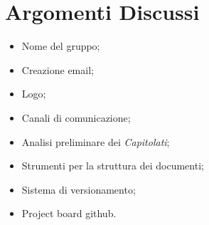 \section{Argomenti Discussi}
	\begin{itemize}
		\item Nome del gruppo;
		\item Creazione email;
		\item Logo;
		\item Canali di comunicazione;
		\item Analisi preliminare dei \textit{Capitolati\glos};
		\item Strumenti per la struttura dei documenti;
		\item Sistema di versionamento;
		\item Project board github.
	\end{itemize}